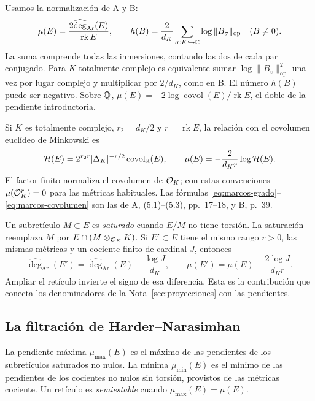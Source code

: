 Usamos la normalización de A y B:
\begin{equation}
 \mu(E)=\frac{2\widehat{\deg}_{\mathrm{Ar}}(E)}{\operatorname{rk}E},
 \qquad
 h(B)=\frac2{d_K}\sum_{\sigma:K\hookrightarrow\mathbb{C}}
                         \log\|B_\sigma\|_{\mathrm{op}}\quad(B\ne0).
 \label{eq:marcos-normalizacion}
\end{equation}
La suma comprende todas las inmersiones, contando las dos de cada par
conjugado. Para $K$ totalmente complejo es equivalente sumar
$\log\|B_v\|_{\mathrm{op}}^2$ una vez por lugar complejo y multiplicar
por $2/d_K$, como en B. El número $h(B)$ puede ser negativo.
Sobre $\mathbb{Q}$, $\mu(E)=-2\log\operatorname{covol}(E)/\operatorname{rk}E$,
el doble de la pendiente introductoria.

Si $K$ es totalmente complejo, $r_2=d_K/2$ y $r=\operatorname{rk}E$,
la relación con el covolumen euclídeo de Minkowski es
\begin{equation}
 \mathcal H(E)=2^{r_2r}|\Delta_K|^{-r/2}
                       \operatorname{covol}_{\mathbb{R}}(E),
 \qquad \mu(E)=-\frac2{d_Kr}\log\mathcal H(E).
 \label{eq:marcos-covolumen}
\end{equation}
El factor finito normaliza el covolumen de $\mathcal{O}_K$; con estas
convenciones $\mu(\mathcal{O}_K^r)=0$ para las métricas habituales.
Las fórmulas \eqref{eq:marcos-grado}--\eqref{eq:marcos-covolumen}
son las de A, (5.1)--(5.3), pp.~17--18, y B, p.~39.

Un subretículo $M\subset E$ es \emph{saturado} cuando $E/M$ no
tiene torsión. La saturación reemplaza $M$ por
$E\cap(M\otimes_{\mathcal{O}_K}K)$. Si $E'\subset E$ tiene el mismo rango
$r>0$, las mismas métricas y un cociente finito de cardinal $J$, entonces
\begin{equation}
 \widehat{\deg}_{\mathrm{Ar}}(E')=
 \widehat{\deg}_{\mathrm{Ar}}(E)-\frac{\log J}{d_K},
 \qquad \mu(E')=\mu(E)-\frac{2\log J}{d_Kr}.
 \label{eq:marcos-coste-indice}
\end{equation}
Ampliar el retículo invierte el signo de esa diferencia. Esta es la
contribución que conecta los denominadores de la
Nota~\ref{sec:proyecciones} con las pendientes.

\subsection{La filtración de Harder--Narasimhan}

La pendiente máxima $\mu_{\max}(E)$ es el máximo de las pendientes
de los subretículos saturados no nulos. La mínima $\mu_{\min}(E)$
es el mínimo de las pendientes de los cocientes no nulos sin torsión,
provistos de las métricas cociente. Un retículo es \emph{semiestable}
cuando $\mu_{\max}(E)=\mu(E)$.

